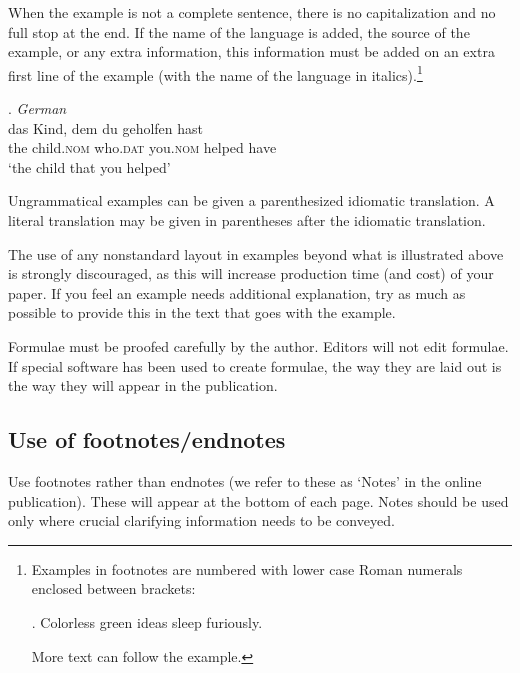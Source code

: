\documentclass[charis,linguex]{glossa}
\begin{document}
When the example is not a complete sentence, there is no capitalization and no full stop at the end. If the name of the language is added, the source of the example, or any extra information, this information must be added on an extra first line of the example (with the name of the language in italics).\footnote{Examples in footnotes are numbered with lower case Roman numerals enclosed between brackets:

\ex. Colorless green ideas sleep furiously.

More text can follow the example.}

\ex. \textit{German} \citep{coetsem:2000}\\ %
\gll das Kind, dem du geholfen hast\\  %
the child.\textsc{nom} who.\textsc{dat} you.\textsc{nom}  helped have\\ %
\glt `the child that you helped' %

Ungrammatical examples can be given a parenthesized idiomatic translation. A literal translation may be given in parentheses after the idiomatic translation.

The use of any nonstandard layout in examples beyond what is illustrated above is strongly discouraged, as this will increase production time (and cost) of your paper. If you feel an example needs additional explanation, try as much as possible to provide this in the text that goes with the example.

Formulae must be proofed carefully by the author. Editors will not edit formulae. If special software has been used to create formulae, the way they are laid out is the way they will appear in the publication.

\subsection{Use of footnotes/endnotes}\label{fn}

Use footnotes rather than endnotes (we refer to these as ‘Notes’ in the online publication). These will appear at the bottom of each page. Notes should be used only where crucial clarifying information needs to be conveyed. 
\end{document}
